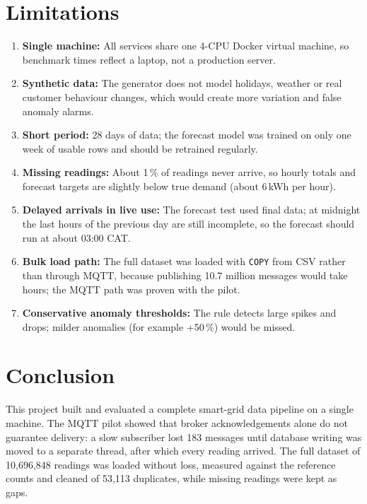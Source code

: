 \documentclass[11pt,a4paper]{article}
\begin{document}
\section{Limitations}

\begin{enumerate}
\item \textbf{Single machine:} All services share one 4-CPU Docker virtual machine, so benchmark times reflect a laptop, not a production server.
\item \textbf{Synthetic data:} The generator does not model holidays, weather or real customer behaviour changes, which would create more variation and false anomaly alarms.
\item \textbf{Short period:} 28 days of data; the forecast model was trained on only one week of usable rows and should be retrained regularly.
\item \textbf{Missing readings:} About 1\,\% of readings never arrive, so hourly totals and forecast targets are slightly below true demand (about 6\,kWh per hour).
\item \textbf{Delayed arrivals in live use:} The forecast test used final data; at midnight the last hours of the previous day are still incomplete, so the forecast should run at about 03:00 CAT.
\item \textbf{Bulk load path:} The full dataset was loaded with \texttt{COPY} from CSV rather than through MQTT, because publishing 10.7 million messages would take hours; the MQTT path was proven with the pilot.
\item \textbf{Conservative anomaly thresholds:} The rule detects large spikes and drops; milder anomalies (for example +50\,\%) would be missed.
\end{enumerate}

\section{Conclusion}

This project built and evaluated a complete smart-grid data pipeline on a single machine. The MQTT pilot showed that broker acknowledgements alone do not guarantee delivery: a slow subscriber lost 183 messages until database writing was moved to a separate thread, after which every reading arrived. The full dataset of 10,696,848 readings was loaded without loss, measured against the reference counts and cleaned of 53,113 duplicates, while missing readings were kept as gaps.
\end{document}
